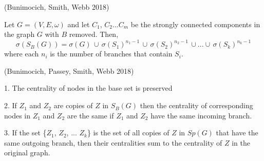 \documentclass[40pt]{article}
\begin{document}
\huge
(Bunimocich, Smith, Webb 2018)

Let $G=(V,E,\omega)$ and let $C_1$, $C_2$...$C_m$ be the strongly connected components in the graph $G$ with $B$ removed. Then,
\[
\sigma(S_B(G)) = \sigma(G)\, \cup\, \sigma(S_1)^{n_1 - 1} \, \cup \, \sigma(S_2)^{n_2 - 1} \, \cup ... \cup \,  \sigma(S_k)^{n_k - 1}
\]
where each $n_i$ is the number of branches that contain $S_i$.

\vspace{1cm}

(Bunimocich, Passey, Smith, Webb 2018)

1. The centrality of nodes in the base set is preserved

\vspace{.5cm}


2. If $Z_1$ and $Z_2$ are copies of $Z$ in $S_B(G)$ then the centrality of corresponding nodes in $Z_1$ and $Z_2$ are the same if $Z_1$ and $Z_2$ have the same incoming branch.

\vspace{.5cm}

3. If the set \{$Z_1$, $Z_2$, ... $Z_k$\} is the set of all copies of $Z$ in $Sp(G)$ that have the same outgoing branch, then their centralities sum to the centrality of $Z$ in the original graph.
\end{document}
